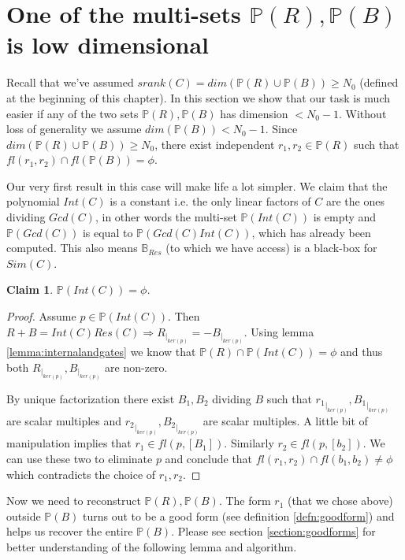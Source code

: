 \documentclass[12pt]{caltech_thesis}
\theoremstyle{plain}
\newtheorem{claim}{Claim}
\theoremstyle{definition}
\newcommand{\CB}{\mathbb{B}}
\newcommand{\PP}{\mathbb{P}}
\begin{document}
\section{One of the multi-sets $\PP(R),\PP(B)$ is low dimensional}


Recall that we've assumed $srank(C) = dim(\PP(R)\cup \PP(B)) \geq N_0 $ (defined at the beginning of this chapter). In this section
we show that our task is much easier if any of the two sets $\PP(R),\PP(B)$ has dimension $< N_0-1$. Without loss of generality
we assume $dim(\PP(B)) < N_0-1$. Since $dim(\PP(R)\cup\PP(B)) \geq N_0$, there exist independent $r_1,r_2\in \PP(R)$ such that 
$fl(r_1,r_2)\cap fl(\PP(B)) = \phi$.

Our very first result in this case will make life a lot simpler. We claim that the polynomial
$Int(C)$ is a constant i.e. the only linear factors of $C$ are the ones dividing $Gcd(C)$, in other words the
multi-set $\PP(Int(C))$ is empty and $\PP(Gcd(C))$ is equal to $\PP(Gcd(C)Int(C))$, which has already been computed. 
This also means $\CB_{Res}$ (to which we have access) is a black-box for $Sim(C)$.

\begin{claim}
 $\PP(Int(C))=\phi$.
 \end{claim}
 \begin{proof}
   Assume $p\in \PP(Int(C))$. Then $R+B = Int(C)Res(C) \Rightarrow R_{|_{ker(p)}} = -B_{|_{ker(p)}}$. Using lemma \ref{lemma:internalandgates}
 we know that $\PP(R)\cap \PP(Int(C)) = \phi$ and thus both $R_{|_{ker(p)}}, B_{|_{ker(p)}}$ are non-zero. 
 
 By unique factorization there exist $B_1,B_2$ dividing $B$ such that
 ${r_1}_{|_{ker(p)}},{B_1}_{|_{ker(p)}}$ are scalar multiples and ${r_2}_{|_{ker(p)}},{B_2}_{|_{ker(p)}}$ are scalar multiples. 
 A little bit of manipulation implies that $r_1\in fl(p,[B_1])$. Similarly
 $r_2\in fl(p,[b_2])$. We can use these two to eliminate $p$ and conclude that $fl(r_1,r_2)\cap fl(b_1,b_2)\neq \phi$
 which contradicts the choice of $r_1,r_2$.
 \end{proof}
 
 Now we need to reconstruct $\PP(R),\PP(B)$. 
 The form $r_1$ (that we chose above) outside $\PP(B)$ turns out to be a good form (see definition \ref{defn:goodform}) 
 and helps us recover the entire $\PP(B)$. Please see section \ref{section:goodforms} for better understanding of the following
 lemma and algorithm.
\end{document}
